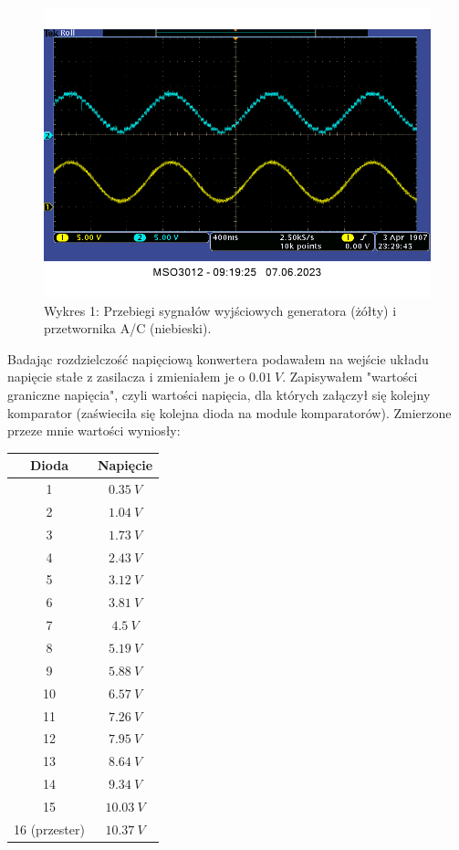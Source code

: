 \documentclass[14pt, table]{extarticle}
\begin{document}
\newpage
\begin{figure}[H]
\includegraphics[width=16cm]{A0}
\centering
\captionsetup{labelformat=empty}
\caption{Wykres 1: Przebiegi sygnałów wyjściowych generatora (żółty) i przetwornika A/C (niebieski).}
\end{figure}

\newpage
Badając rozdzielczość napięciową konwertera podawałem na wejście układu napięcie stałe z zasilacza i zmieniałem je o $0.01 \ V$. Zapisywałem "wartości graniczne napięcia", czyli wartości napięcia, dla których załączył się kolejny komparator (zaświeciła się kolejna dioda na module komparatorów). Zmierzone przeze mnie wartości wyniosły:

\begin{center}
\begin{tabular}{| c | c |}
\hline
\textbf{Dioda} & \textbf{Napięcie} \\
\hline
1 & $0.35 \ V$ \\
\hline
2 & $1.04 \ V$ \\
\hline
3 & $1.73 \ V$ \\
\hline
4 & $2.43 \ V$ \\
\hline
5 & $3.12 \ V$ \\
\hline
6 & $3.81 \ V$ \\
\hline
7 & $4.5 \ V$ \\
\hline
8 & $5.19 \ V$ \\
\hline
9 & $5.88 \ V$ \\
\hline
10 & $6.57 \ V$ \\
\hline
11 & $7.26 \ V$ \\
\hline
12 & $7.95 \ V$ \\
\hline
13 & $8.64 \ V$ \\
\hline
14 & $9.34 \ V$ \\
\hline
15 & $10.03 \ V$ \\
\hline
16 (przester) & $10.37 \ V$ \\
\hline
\end{tabular}
\end{center}
\end{document}

